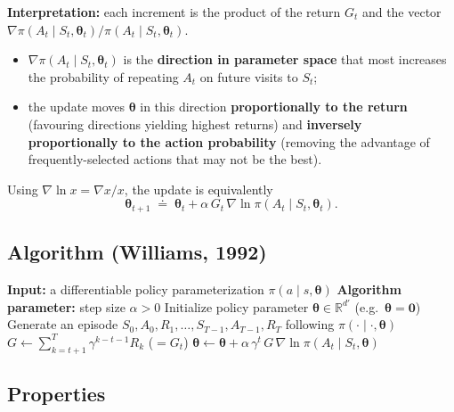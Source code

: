 \documentclass[11pt,a4paper]{article}
\theoremstyle{definition}
\theoremstyle{plain}
\theoremstyle{remark}
\begin{document}
\textbf{Interpretation:} each increment is the product of the return $G_t$ and the vector $\nabla \pi(A_t \mid S_t, \boldsymbol{\theta}_t) / \pi(A_t \mid S_t, \boldsymbol{\theta}_t)$.
\begin{itemize}
    \item $\nabla \pi(A_t \mid S_t, \boldsymbol{\theta}_t)$ is the \textbf{direction in parameter space} that most increases the probability of repeating $A_t$ on future visits to $S_t$;
    \item the update moves $\boldsymbol{\theta}$ in this direction \textbf{proportionally to the return} (favouring directions yielding highest returns) and \textbf{inversely proportionally to the action probability} (removing the advantage of frequently-selected actions that may not be the best).
\end{itemize}

Using $\nabla \ln x = \nabla x / x$, the update is equivalently
\[
    \boldsymbol{\theta}_{t+1} \;\doteq\; \boldsymbol{\theta}_t + \alpha\, G_t\, \nabla \ln \pi(A_t \mid S_t, \boldsymbol{\theta}_t).
\]

\subsection{Algorithm (Williams, 1992)}

\begin{algorithm}[H]
\caption{REINFORCE: Monte-Carlo Policy-Gradient Control (episodic) for $\pi_*$}
\begin{algorithmic}
\STATE \textbf{Input:} a differentiable policy parameterization $\pi(a \mid s, \boldsymbol{\theta})$
\STATE \textbf{Algorithm parameter:} step size $\alpha > 0$
\STATE Initialize policy parameter $\boldsymbol{\theta} \in \mathbb{R}^{d'}$ (e.g.\ $\boldsymbol{\theta} = \mathbf{0}$)
    \STATE Generate an episode $S_0, A_0, R_1, \ldots, S_{T-1}, A_{T-1}, R_T$ following $\pi(\cdot \mid \cdot, \boldsymbol{\theta})$
        \STATE $G \leftarrow \sum_{k=t+1}^{T} \gamma^{k-t-1} R_k$ \quad ($= G_t$)
        \STATE $\boldsymbol{\theta} \leftarrow \boldsymbol{\theta} + \alpha\, \gamma^t\, G\, \nabla \ln \pi(A_t \mid S_t, \boldsymbol{\theta})$
    \ENDFOR
\ENDFOR
\end{algorithmic}
\end{algorithm}

\subsection{Properties}
\end{document}
